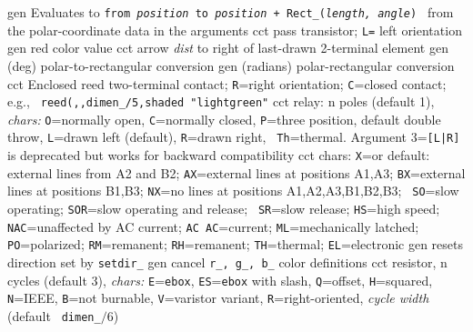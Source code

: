   {gen}
  {Evaluates to {\tt from {\sl position} to
   {\sl position} + Rect\_({\sl length, angle}) }
   from the polar-coordinate data in the arguments }
  {cct}
  {pass transistor; {\tt L=} left orientation
    }
%
  {gen}
  {red color value}
  {cct}
  {arrow {\sl dist} to right of last-drawn 2-terminal element
   }
  {gen}
  {(deg) polar-to-rectangular conversion}
  {gen}
  {(radians) polar-rectangular conversion}
  {cct}
  {Enclosed reed two-terminal contact;
   {\tt R}=right orientation; {\tt C}=closed contact; e.g., {\tt
   reed(,,dimen\_/5,shaded "lightgreen"} }
  {cct}
  {relay: n poles (default 1), {\sl chars:} {\tt O}=normally open,
    {\tt C}=normally closed, {\tt P}=three position, default double
    throw, {\tt L}=drawn left (default), {\tt R}=drawn right, {\tt
    Th}=thermal.  Argument 3={\tt [L|R]} is deprecated but works for
    backward compatibility
   }
  {cct}
  {chars:
    {\tt X}=or default: external lines from A2 and B2; {\tt AX}=external
    lines at positions A1,A3; {\tt BX}=external lines at positions
    B1,B3; {\tt NX}=no lines at positions A1,A2,A3,B1,B2,B3; {\tt
    SO}=slow operating; {\tt SOR}=slow operating and release; {\tt
    SR}=slow release; {\tt HS}=high speed; {\tt NAC}=unaffected by AC
    current; {\tt AC AC}=current; {\tt ML}=mechanically latched; {\tt
    PO}=polarized; {\tt RM}=remanent; {\tt RH}=remanent; {\tt TH}=thermal;
    {\tt EL}=electronic
   }
  {gen}
  {resets direction set by {\tt setdir\_}}
  {gen}
  {cancel {\tt r\_, g\_, b\_} color definitions}
  {cct}
  {resistor, n cycles (default 3), {\sl chars:}
    {\tt E}={\tt ebox}, {\tt ES}={\tt ebox} with slash, {\tt Q}=offset,
    {\tt H}=squared, {\tt N}=IEEE, {\tt B}=not burnable, {\tt V}=varistor
    variant, {\tt R}=right-oriented, {\sl cycle width} (default {\tt
    dimen\_}$/6$) }
